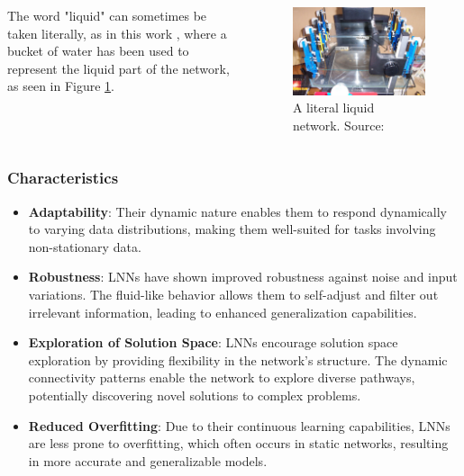 \begin{frame}[allowframebreaks]
	\begin{columns}
			\par The word "liquid" can sometimes be taken literally, as in this work \cite{10.1007/978-3-540-39432-7_63}, where a bucket of water has been used to represent the liquid part of the network, as seen in Figure \ref{fig:literallyaliquidnetwork}.
			\begin{figure}
				\centering
				\includegraphics[width=\linewidth]{images/leterallyALiquidNetwork}
				\caption[A literal liquid network]{A literal liquid network. Source: \cite{10.1007/978-3-540-39432-7_63}}
				\label{fig:literallyaliquidnetwork}
			\end{figure}
	\end{columns}
\end{frame}
\begin{frame}
	\frametitle{Characteristics}
	\begin{itemize}
		\item \textbf{Adaptability}: Their dynamic nature enables them to respond dynamically to varying data distributions, making them well-suited for tasks involving non-stationary data.
		\item \textbf{Robustness}: LNNs have shown improved robustness against noise and input variations. The fluid-like behavior allows them to self-adjust and filter out irrelevant information, leading to enhanced generalization capabilities.
		\item \textbf{Exploration of Solution Space}: LNNs encourage solution space exploration by providing flexibility in the network's structure. The dynamic connectivity patterns enable the network to explore diverse pathways, potentially discovering novel solutions to complex problems.
		\item \textbf{Reduced Overfitting}: Due to their continuous learning capabilities, LNNs are less prone to overfitting, which often occurs in static networks, resulting in more accurate and generalizable models.
	\end{itemize}
\end{frame}
